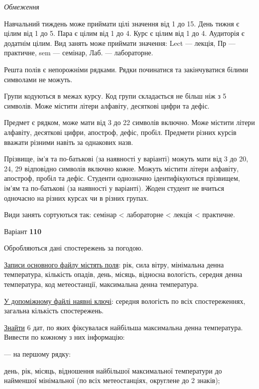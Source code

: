\documentclass[11pt, ukrainian]{article}
\begin{document}

\bigskip\textit{Обмеження}

Навчальний тиждень може приймати цілі значення від 1 до 15.
День тижня є цілим від 1 до 5. Пара є цілим від 1 до 4.
Курс є цілим від 1 до 4. Аудиторія є додатнім цілим.
Вид занять може приймати значення:
Lect --- лекція, Пр --- практичне, sem --- семінар, Лаб. --- лабораторне.

Решта полів є непорожніми рядками.
Рядки починатися та закінчуватися білими символами не можуть.

Групи кодуються в межах курсу.
Код групи складається не більш ніж з 5 символів.
Може містити літери алфавіту, десяткові цифри та дефіс.

Предмет є рядком, може мати від 3 до 22 символів включно.
Може містити літери алфавіту, десяткові цифри, апостроф, дефіс, пробіл.
Предмети різних курсів вважати різними навіть за однакових назв.

Прізвище, ім’я та по-батькові (за наявності у варіанті)
можуть мати від 3 до 20, 24, 29 відповідно символів включно кожне.
Можуть містити літери алфавіту, апостроф, пробіл та дефіс.
Студенти однозначно ідентифікуються прізвищем, ім’ям та по-батькові (за наявності у варіанті).
Жоден студент не вчиться одночасно на різних курсах чи в різних групах.

Види занять сортуються так: семінар < лабораторне < лекція < практичне.





\par
\newpage
{\center Варіант  \No \textbf { 110 }\par}
\bigskip
Обробляються дані спостережень за погодою. 

\underline{Записи основного файлу містять поля}: рік, сила вітру, мінімальна денна температура, кількість опадів, день, місяць, відносна вологість, середня денна температура, код метеостанції, максимальна денна температура.

\underline{У допоміжному файлі наявні ключі}: середня вологість по всіх спостереженнях, загальна кількість спостережень.

\underline{Знайти} 6 дат, по яких фіксувалася найбільша максимальна денна температура. Вивести по кожному з них інформацію:\par
{\noindent}--- на першому рядку:\par
день, рік, місяць, відношення найбільшої максимальної температури до найменшої мінімальної (по всіх метеостанціях, округлене до 2 знаків);
\end{document}
